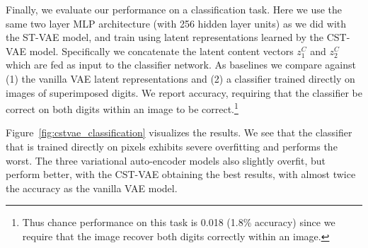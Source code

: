 Finally, we evaluate our performance on a classification task.
Here we use the same two layer MLP architecture (with 256 hidden layer units) as we did 
with the ST-VAE model, and train using latent representations
learned by the CST-VAE model.  
Specifically we concatenate the latent content vectors $z^C_1$ and $z^C_2$
which are fed as input to the classifier network.  
As baselines we compare against (1) the vanilla VAE latent representations 
and (2) a classifier trained directly on images of superimposed
digits.  We report accuracy, requiring that the classifier 
be correct on both digits within an image to be correct.\footnote{
%
Thus  
 chance performance on this task is 0.018 (1.8\% accuracy) since we
 require that the image recover both digits correctly 
 within an image.
}

Figure~\ref{fig:cstvae_classification} visualizes the results.  
We see that the classifier that is trained directly
on pixels exhibits severe overfitting and performs the worst.  The three variational auto-encoder models also
slightly overfit, but perform better, with the CST-VAE obtaining the
best results, with almost twice the accuracy as the vanilla 
VAE model.

\vspace{-2mm}












